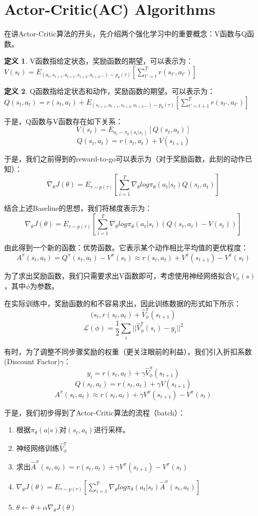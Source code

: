 \documentclass{article}
\theoremstyle{definition}
\newtheorem{definition}{定义}[section]
\begin{document}
\section{Actor-Critic(AC) Algorithms}
\par 在讲Actor-Critic算法的开头，先介绍两个强化学习中的重要概念：V函数与Q函数。
\begin{definition}
    V函数指给定状态，奖励函数的期望，可以表示为：$ V(s_t)=E_{(a_t,s_{t+1},a_{t+1},s_{t+2},a_{t+2}...)\sim p_{\theta}(\tau)}[\sum_{t'=t}^Tr(s_{t'},a_{t'})] $
\end{definition}
\begin{definition}
    Q函数指给定状态和动作，奖励函数的期望。可以表示为：$ Q(s_t,a_t)=r(s_t,a_t)+E_{(s_{t+1},a_{t+1},s_{t+2},a_{t+2}...)\sim p_{\theta}(\tau)}[\sum_{t'=t+1}^Tr(s_{t'},a_{t'})] $
\end{definition}
\par 于是，Q函数与V函数存在如下关系：
\[
V(s_t)=E_{a_t\sim \pi_{\theta}(a_t|s_t)}[Q(s_t,a_t)]
\]
\[
Q(s_t,a_t)=r(s_t,a_t)+V(s_{t+1})
\]
\par 于是，我们之前得到的reward-to-go可以表示为（对于奖励函数，此刻的动作已知）：
\[
\nabla_{\theta}J(\theta)=E_{\tau\sim p(\tau)}[\sum_{i=1}^T\nabla_{\theta}log\pi_{\theta}(a_t|s_t)Q(s_t,a_t)]
\]
\par 结合上述Baseline的思想，我们将梯度表示为：
\[
\nabla_{\theta}J(\theta)=E_{\tau\sim p(\tau)}[\sum_{i=1}^T\nabla_{\theta}log\pi_{\theta}(a_t|s_t)(Q(s_t,a_t)-V(s_t))]
\]
\par 由此得到一个新的函数：优势函数。它表示某个动作相比平均值的更优程度：
\[
A^{\pi}(s_t,a_t)=Q^{\pi}(s_t,a_t)-V^{\pi}(s_t)\approx r(s_t,a_t)+V^{\pi}(s_{t+1})-V^{\pi}(s_t)
\]
\par 为了求出奖励函数，我们只需要求出V函数即可，考虑使用神经网络拟合$ V_{\phi}(s)$，其中$ \phi $为参数。
\par 在实际训练中，奖励函数的和不容易求出，因此训练数据的形式如下所示：
\[
{(s_t,r(s_t,a_t)+\hat{V}_{\phi}^{\pi}(s_{t+1})}
\]
\[
\mathcal{L}(\phi)=\frac{1}{2}\sum_i ||\hat{V}_{\phi}^{\pi}(s_{i})-y_i||^2
\]
\par 有时，为了调整不同步骤奖励的权重（更关注眼前的利益），我们引入折扣系数(Discount Factor)$ \gamma $：
\[
y_i=r(s_t,a_t)+\gamma\hat{V}_{\phi}^{\pi}(s_{t+1})
\]
\[
Q(s_t,a_t)=r(s_t,a_t)+\gamma V(s_{t+1})
\]
\[
A^{\pi}(s_t,a_t)\approx r(s_t,a_t)+\gamma V^{\pi}(s_{t+1})-V^{\pi}(s_t)
\]
\par 于是，我们初步得到了Actor-Critic算法的流程（batch）：
\begin{enumerate}
    \item 根据$ \pi_{\theta}(a|s) $对$(s_t,a_t)$进行采样。
    \item 神经网络训练$ \hat{V}_{\phi}^{\pi} $
    \item 求出$ \hat{A}^{\pi}(s_t,a_t)= r(s_t,a_t)+\gamma V^{\pi}(s_{t+1})-V^{\pi}(s_t) $
    \item $ \nabla_{\theta}J(\theta)=E_{\tau\sim p(\tau)}[\sum_{i=1}^T\nabla_{\theta}log\pi_{\theta}(a_t|s_t)\hat{A}^{\pi}(s_t,a_t)] $
    \item $ \theta\leftarrow\theta+\alpha\nabla_{\theta}J(\theta) $
\end{enumerate}
\end{document}
